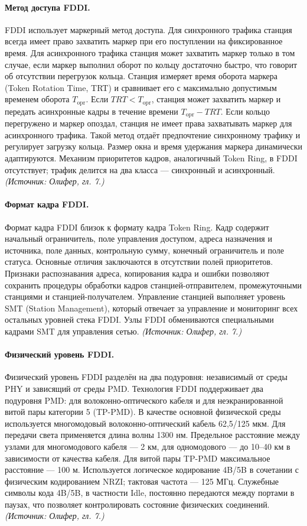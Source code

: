 \documentclass[a4paper,12pt]{article}
\begin{document}
\paragraph{Метод доступа FDDI.}
FDDI использует маркерный метод доступа. Для синхронного трафика станция всегда имеет право захватить маркер при его поступлении на фиксированное время. Для асинхронного трафика станция может захватить маркер только в том случае, если маркер выполнил оборот по кольцу достаточно быстро, что говорит об отсутствии перегрузок кольца. Станция измеряет время оборота маркера (Token Rotation Time, TRT) и сравнивает его с максимально допустимым временем оборота \(T_{\text{opr}}\). Если \(TRT < T_{\text{opr}}\), станция может захватить маркер и передать асинхронные кадры в течение времени \(T_{\text{opr}} - TRT\). Если кольцо перегружено и маркер опоздал, станция не имеет права захватывать маркер для асинхронного трафика. Такой метод отдаёт предпочтение синхронному трафику и регулирует загрузку кольца. Размер окна и время удержания маркера динамически адаптируются. Механизм приоритетов кадров, аналогичный Token Ring, в FDDI отсутствует; трафик делится на два класса — синхронный и асинхронный.
\textit{(Источник: Олифер, гл. 7.)}

\paragraph{Формат кадра FDDI.}
Формат кадра FDDI близок к формату кадра Token Ring. Кадр содержит начальный ограничитель, поле управления доступом, адреса назначения и источника, поле данных, контрольную сумму, конечный ограничитель и поле статуса. Основные отличия заключаются в отсутствии полей приоритетов. Признаки распознавания адреса, копирования кадра и ошибки позволяют сохранить процедуры обработки кадров станцией-отправителем, промежуточными станциями и станцией-получателем. Управление станцией выполняет уровень SMT (Station Management), который отвечает за управление и мониторинг всех остальных уровней стека FDDI. Узлы FDDI обмениваются специальными кадрами SMT для управления сетью.
\textit{(Источник: Олифер, гл. 7.)}

\paragraph{Физический уровень FDDI.}
Физический уровень FDDI разделён на два подуровня: независимый от среды PHY и зависящий от среды PMD. Технология FDDI поддерживает два подуровня PMD: для волоконно-оптического кабеля и для неэкранированной витой пары категории 5 (TP-PMD). В качестве основной физической среды используется многомодовый волоконно-оптический кабель 62,5/125 мкм. Для передачи света применяется длина волны 1300 нм. Предельное расстояние между узлами для многомодового кабеля — 2 км, для одномодового — до 10–40 км в зависимости от качества кабеля. Для витой пары TP-PMD максимальное расстояние — 100 м. Используется логическое кодирование 4B/5B в сочетании с физическим кодированием NRZI; тактовая частота — 125 МГц. Служебные символы кода 4B/5B, в частности Idle, постоянно передаются между портами в паузах, что позволяет контролировать состояние физических соединений.
\textit{(Источник: Олифер, гл. 7.)}
\end{document}
